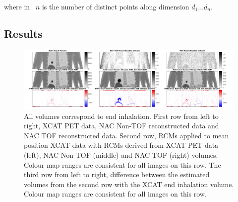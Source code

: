                 \noindent where in~ $n$ is the number of distinct points along dimension $d_1 \dotso d_n$.
            
        \subsection{Results} \label{sec:impact_of_tof_on_respiratory_motion_model_estimation_using_pre_gated_no_intra_cycle_motion_nac_pet_results}
            \begin{figure}
                \centering
                
                \includegraphics[width=1.0\linewidth]{figures/motion_correction_1_results_1_output.png}
                
                \captionsetup{singlelinecheck=false}
                \caption{
                    All volumes correspond to end inhalation. First row from left to right, \gls{XCAT} \gls{PET} data, \gls{NAC} \gls{Non-TOF} reconstructed data and \gls{NAC} \gls{TOF} reconstructed data. Second row, \glspl{RCM} applied to mean position \gls{XCAT} data with \glspl{RCM} derived from \gls{XCAT} \gls{PET} data (left), \gls{NAC} \gls{Non-TOF} (middle) and \gls{NAC} \gls{TOF} (right) volumes. Colour map ranges are consistent for all images on this row. The third row from left to right, difference between the estimated volumes from the second row with the \gls{XCAT} end inhalation volume. Colour map ranges are consistent for all images on this row.
                }
                \label{fig:impact_of_tof_on_respiratory_motion_model_estimation_using_pre_gated_no_intra_cycle_motion_nac_pet_results_output}
            \end{figure}
            
